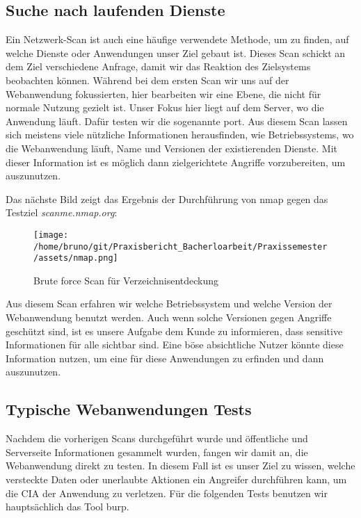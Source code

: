 \subsection{Suche nach laufenden Dienste}

Ein Netzwerk-Scan ist auch eine häufige verwendete Methode, um zu finden, auf welche Dienste oder Anwendungen unser Ziel gebaut ist. Dieses Scan schickt an dem Ziel verschiedene Anfrage, damit wir das Reaktion des Zielsystems beobachten können. Während bei dem ersten Scan wir uns auf der Webanwendung fokussierten, hier bearbeiten wir eine Ebene, die nicht für normale Nutzung gezielt ist. Unser Fokus hier liegt auf dem Server, wo die Anwendung läuft. Dafür testen wir die sogenannte \gls{port}. Aus diesem Scan lassen sich meistens viele nützliche Informationen herausfinden, wie Betriebssystems, wo die Webanwendung läuft, Name und Versionen der existierenden Dienste. Mit dieser Information ist es möglich dann zielgerichtete Angriffe vorzubereiten, um  auszunutzen.

Das nächste Bild zeigt das Ergebnis der Durchführung von \gls{nmap} gegen das Testziel \textit{scanme.nmap.org}:

\begin{figure}[h]
    \centering
    \texttt{[image: /home/bruno/git/Praxisbericht\_Bacherloarbeit/Praxissemester/assets/nmap.png]}
    \caption{Brute force Scan für Verzeichnisentdeckung}
    \centering
\end{figure}

Aus diesem Scan erfahren wir welche Betriebssystem und welche Version der Webanwendung benutzt werden. Auch wenn solche Versionen gegen Angriffe geschützt sind, ist es unsere Aufgabe dem Kunde zu informieren, dass sensitive Informationen für alle sichtbar sind. Eine böse absichtliche Nutzer könnte diese Information nutzen, um eine  für diese Anwendungen zu erfinden und dann auszunutzen.

\subsection{Typische Webanwendungen Tests}

Nachdem die vorherigen Scans durchgeführt wurde und öffentliche und Serverseite Informationen gesammelt wurden, fangen wir damit an, die Webanwendung direkt zu testen. In diesem Fall ist es unser Ziel zu wissen, welche versteckte Daten oder unerlaubte Aktionen ein Angreifer durchführen kann, um die \gls{CIA} der Anwendung zu verletzen. Für die folgenden Tests benutzen wir hauptsächlich das Tool \gls{burp}.

